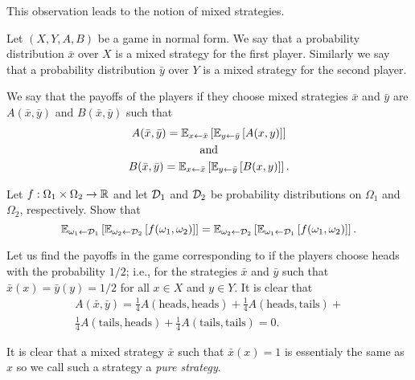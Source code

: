This observation leads to the notion of mixed strategies.
\begin{definition}
  Let $(X, Y, A, B)$ be a game in normal form. We say that a probability
  distribution $\bar{x}$ over $X$ is a mixed strategy for the first player.
  Similarly we say that a probability distribution $\bar{y}$ over $Y$ is a mixed
  strategy for the second player.


  We say that the payoffs of the players if they choose mixed strategies
  $\bar{x}$ and $\bar{y}$ are $A(\bar{x}, \bar{y})$ and $B(\bar{x}, \bar{y})$ 
  such that
  \begin{gather*}
    A(\bar{x}, \bar{y}) = 
      \expectation[x \gets \bar{x}]{\expectation[y \gets \bar{y}]{A(x, y)}} \\ 
    \text{and} \\
    B(\bar{x}, \bar{y}) = 
      \expectation[x \gets \bar{x}]{\expectation[y \gets \bar{y}]{B(x, y)}}.
  \end{gather*}
\end{definition}

\begin{exercise}
  Let $f : \Omega_1 \times \Omega_2 \to \R$ and let $\Distribution{D}_1$ and
  $\Distribution{D}_2$ be probability distributions on $\Omega_1$ and
  $\Omega_2$, respectively. Show that 
  \[
  \expectation[\omega_1 \gets \Distribution{D}_1]{
    \expectation[\omega_2 \gets \Distribution{D}_2]{f(\omega_1, \omega_2)}
  } = 
  \expectation[\omega_2 \gets \Distribution{D}_2]{
    \expectation[\omega_1 \gets \Distribution{D}_1]{f(\omega_1, \omega_2)}}.
  \]
\end{exercise}

Let us find the payoffs in the game corresponding  to
 if the players choose heads with the
probability $1 / 2$; i.e., for the strategies $\bar{x}$ and $\bar{y}$ such that
$\bar{x}(x) = \bar{y}(y) = 1 / 2$ for all $x \in X$ and $y \in Y$. It is clear
that 
\begin{multline*}
  A(\bar{x}, \bar{y}) = 
  \frac{1}{4} A(\text{heads}, \text{heads}) + 
  \frac{1}{4} A(\text{heads}, \text{tails}) + \\
  \frac{1}{4} A(\text{tails}, \text{heads}) +
  \frac{1}{4} A(\text{tails}, \text{tails}) = 0.
\end{multline*}

It is clear that a mixed strategy $\bar{x}$ such that $\bar{x}(x) = 1$ is
essentialy the same as $x$ so we call such a strategy a \emph{pure strategy}.

